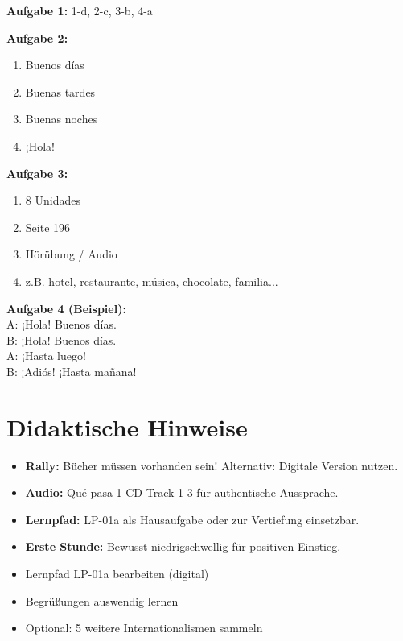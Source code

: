 \documentclass[11pt,a4paper]{article}
\begin{document}
\vspace{0.5em}
\textbf{Aufgabe 1:} 1-d, 2-c, 3-b, 4-a

\vspace{0.5em}
\textbf{Aufgabe 2:}
\begin{enumerate}[label=\alph*), nosep, leftmargin=*]
    \item Buenos días
    \item Buenas tardes
    \item Buenas noches
    \item ¡Hola!
\end{enumerate}

\vspace{0.5em}
\textbf{Aufgabe 3:}
\begin{enumerate}[label=\alph*), nosep, leftmargin=*]
    \item 8 Unidades
    \item Seite 196
    \item Hörübung / Audio
    \item z.B. hotel, restaurante, música, chocolate, familia...
\end{enumerate}

\vspace{0.5em}
\textbf{Aufgabe 4 (Beispiel):}\\
A: ¡Hola! Buenos días.\\
B: ¡Hola! Buenos días.\\
A: ¡Hasta luego!\\
B: ¡Adiós! ¡Hasta mañana!

\vspace{1.5em}

\section*{Didaktische Hinweise}

\begin{itemize}[leftmargin=*, nosep]
    \item \textbf{Rally:} Bücher müssen vorhanden sein! Alternativ: Digitale Version nutzen.
    \item \textbf{Audio:} Qué pasa 1 CD Track 1-3 für authentische Aussprache.
    \item \textbf{Lernpfad:} LP-01a als Hausaufgabe oder zur Vertiefung einsetzbar.
    \item \textbf{Erste Stunde:} Bewusst niedrigschwellig für positiven Einstieg.
\end{itemize}

\vspace{1em}

\begin{infobox}[Hausaufgabe]
\begin{itemize}[nosep, leftmargin=*]
    \item Lernpfad LP-01a bearbeiten (digital)
    \item Begrüßungen auswendig lernen
    \item Optional: 5 weitere Internationalismen sammeln
\end{itemize}
\end{infobox}
\end{document}
